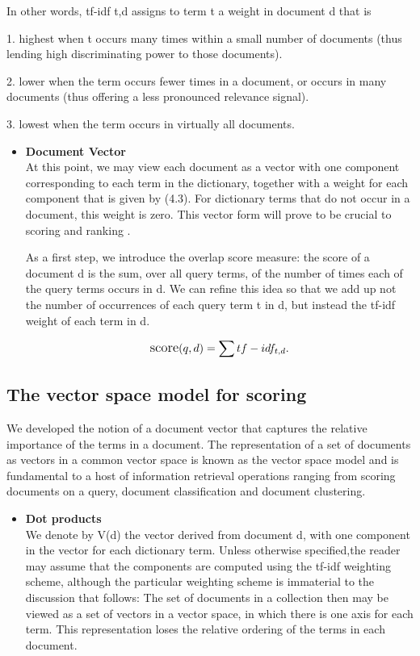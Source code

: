 In other words, tf-idf t,d assigns to term t a weight in document d that is

1. highest when t occurs many times within a small number of documents
(thus lending high discriminating power to those documents).

2. lower when the term occurs fewer times in a document, or occurs in many
documents (thus offering a less pronounced relevance signal).

3. lowest when the term occurs in virtually all documents.     

\begin{itemize}
     \item \textbf{Document Vector}\\
    At this point, we may view each document as a vector with one component
    corresponding to each term in the dictionary, together with a weight for each
    component that is given by (4.3). For dictionary terms that do not occur in
    a document, this weight is zero. This vector form will prove to be crucial to
    scoring and ranking .

    As a first step, we introduce the overlap score measure: the score of a document d is the sum, over all query terms, of the number of times each of the query terms occurs in d. We can refine this idea so that we add up not the number of occurrences of each query term t in d, but instead the tf-idf weight of each term in d.
   
   \begin{equation}
        \large
         \text{score}(q,d) =\sum tf-idf_{t,d}. \end{equation}
\end{itemize}


\subsection{The vector space model for scoring}

We developed the notion of a document vector that captures the relative importance of the terms in a document. 
The representation of a set of documents as vectors in a common vector space is known as the vector space model and is fundamental to a host of information retrieval operations ranging from scoring documents on a query, document classification and document clustering.

\begin{itemize}
     \item \textbf{Dot products}\\
     We denote by V(d) the vector derived from document d, with one component in the vector for each dictionary term. Unless otherwise specified,the reader may assume that the components are computed using the tf-idf weighting scheme, although the particular weighting scheme is immaterial to the discussion that follows: 
     The set of documents in a collection then may be viewed as a set of vectors in a vector space, in which there is one axis for each term.              This representation loses the relative ordering of the terms in each document.
      
     
\end{itemize}

